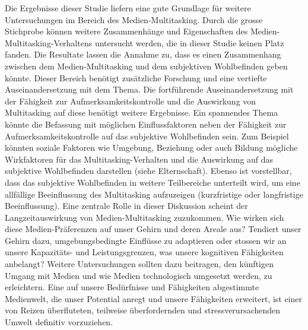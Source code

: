 \label{section.diskussion.ausblick}
Die Ergebnisse dieser Studie liefern eine gute Grundlage für weitere Untersuchungen im Bereich des Medien-Multitasking. Durch die grosse Stichprobe können weitere Zusammenhänge und Eigenschaften des Medien-Multitasking-Verhaltens untersucht werden, die in dieser Studie keinen Platz fanden. Die Resultate lassen die Annahme zu, dass es einen Zusammenhang zwischen dem Medien-Multitasking und dem subjektiven Wohlbefinden geben könnte. Dieser Bereich benötigt zusätzliche Forschung und eine vertiefte Auseinandersetzung mit dem Thema. Die fortführende Auseinandersetzung mit der Fähigkeit zur Aufmerksamkeitskontrolle und die Auswirkung von Multitasking auf diese benötigt weitere Ergebnisse. Ein spannendes Thema könnte die Befassung mit möglichen Einflussfaktoren neben der Fähigkeit zur Aufmerksamkeitskontrolle auf das subjektive Wohlbefinden sein. Zum Beispiel könnten soziale Faktoren wie Umgebung, Beziehung oder auch Bildung mögliche Wirkfaktoren für das Multitasking-Verhalten und die Auswirkung auf das subjektive Wohlbefinden darstellen (siehe Elternschaft). Ebenso ist vorstellbar, dass das subjektive Wohlbefinden in weitere Teilbereiche unterteilt wird, um eine allfällige Beeinflussung des Multitasking aufzuzeigen (kurzfristige oder langfristige Beeinflussung). Eine zentrale Rolle in dieser Diskussion scheint der Langzeitauswirkung von Medien-Multitasking zuzukommen. Wie wirken sich diese Medien-Präferenzen auf unser Gehirn und deren Areale aus? Tendiert unser Gehirn dazu, umgebungsbedingte Einflüsse zu adaptieren oder stossen wir an unsere Kapazitäts- und Leistungsgrenzen, was unsere kognitiven Fähigkeiten anbelangt? Weitere Untersuchungen sollten dazu beitragen, den künftigen Umgang mit Medien und wie Medien technologisch umgesetzt werden, zu erleichtern. Eine auf unsere Bedürfnisse und Fähigkeiten abgestimmte Medienwelt, die unser Potential anregt und unsere Fähigkeiten erweitert, ist einer von Reizen überfluteten, teilweise überfordernden und stressverursachenden Umwelt definitiv vorzuziehen. 

